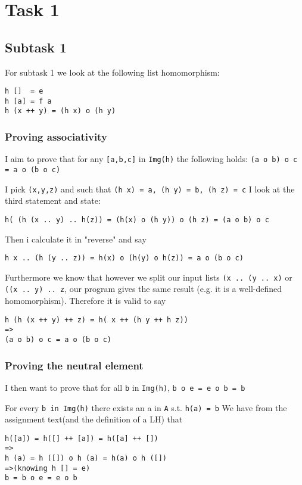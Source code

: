 \documentclass[11pt]{article}
\date{\today}
\title{}
\begin{document}
\tableofcontents

\section{Task 1}
\label{sec:org95b2583}
\subsection{Subtask 1}
\label{sec:orga1948f9}
For subtask 1 we look at the following list homomorphism:
\begin{verbatim}
h []  = e
h [a] = f a
h (x ++ y) = (h x) o (h y)
\end{verbatim}
\subsubsection{Proving associativity}
\label{sec:org17fa34f}
I aim to prove that for any \texttt{[a,b,c]} in \texttt{Img(h)} the following holds: \texttt{(a o b) o c = a o (b o c)} 

I pick \texttt{(x,y,z)} and such that \texttt{(h x) = a, (h y) = b, (h z) = c} 
I look at the third statement and state:
\begin{verbatim}
h( (h (x .. y) .. h(z)) = (h(x) o (h y)) o (h z) = (a o b) o c
\end{verbatim}
Then i calculate it in "reverse" and say
\begin{verbatim}
h x .. (h (y .. z)) = h(x) o (h(y) o h(z)) = a o (b o c)
\end{verbatim}
Furthermore we know that however we split our input lists \texttt{(x .. (y .. x)} or \texttt{((x .. y) .. z}, our
program gives the same result (e.g. it is a well-defined homomorphism). Therefore it is valid to say
\begin{verbatim}
h (h (x ++ y) ++ z) = h( x ++ (h y ++ h z))
=>
(a o b) o c = a o (b o c)
\end{verbatim}

\subsubsection{Proving the neutral element}
\label{sec:org0228c9c}
I then want to prove that for all \texttt{b} in \texttt{Img(h)}, \texttt{b o e = e o b = b}  

For every \texttt{b in Img(h)} there exists an a in \texttt{A} s.t. \texttt{h(a) = b}
We have from the assignment text(and the definition of a LH) that
\begin{verbatim}
h([a]) = h([] ++ [a]) = h([a] ++ [])
=> 
h (a) = h ([]) o h (a) = h(a) o h ([])
=>(knowing h [] = e)
b = b o e = e o b
\end{verbatim}
\end{document}
